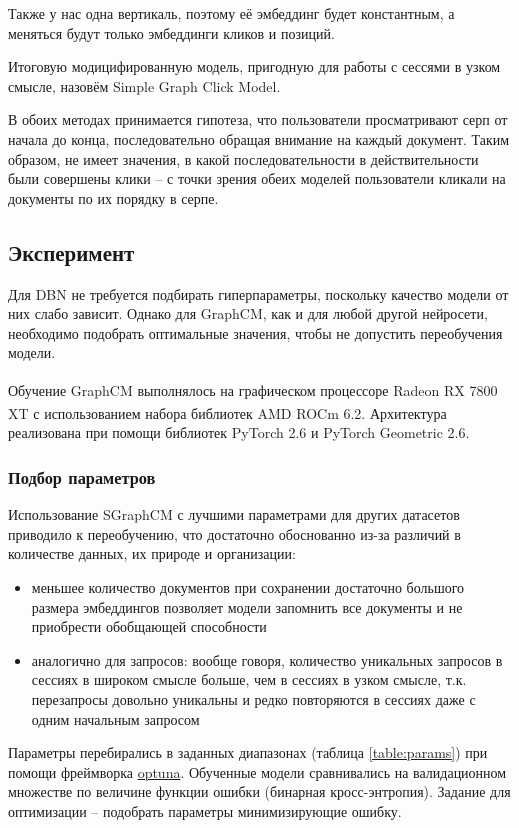\documentclass[diploma]{nanolab2015}
\begin{document}
Также у нас одна вертикаль, поэтому её эмбеддинг будет константным, а меняться будут только эмбеддинги кликов и позиций.

Итоговую модицифированную модель, пригодную для работы с сессями в узком смысле, назовём Simple Graph Click Model.

\bigbreak

В обоих методах принимается гипотеза, что пользователи просматривают серп от начала до конца, последовательно обращая внимание на каждый документ. Таким образом, не имеет значения, в какой последовательности в действительности были совершены клики -- с точки зрения обеих моделей пользователи кликали на документы по их порядку в серпе.

\subsection{Эксперимент}
Для DBN не требуется подбирать гиперпараметры, поскольку качество модели от них слабо зависит. Однако для GraphCM, как и для любой другой нейросети, необходимо подобрать оптимальные значения, чтобы не допустить переобучения модели.

Обучение GraphCM выполнялось на графическом процессоре Radeon\textsuperscript{\texttrademark} RX 7800 XT с использованием набора библиотек AMD ROCm\textsuperscript{\texttrademark} 6.2. Архитектура реализована при помощи библиотек PyTorch 2.6 и PyTorch Geometric 2.6.
\subsubsection{Подбор параметров}
Использование SGraphCM с лучшими параметрами для других датасетов приводило к переобучению, что достаточно обоснованно из-за различий в количестве данных, их природе и организации:
\begin{itemize}
  \item меньшее количество документов при сохранении достаточно большого размера эмбеддингов позволяет модели запомнить все документы и не приобрести обобщающей способности
  \item аналогично для запросов: вообще говоря, количество уникальных запросов в сессиях в широком смысле больше, чем в сессиях в узком смысле, т.к. перезапросы довольно уникальны и редко повторяются в сессиях даже с одним начальным запросом
\end{itemize}

Параметры перебирались в заданных диапазонах (таблица \ref{table:params}) при помощи фреймворка \href{https://optuna.org/}{optuna}. Обученные модели сравнивались на валидационном множестве по величине функции ошибки (бинарная кросс-энтропия). Задание для оптимизации -- подобрать параметры минимизирующие ошибку.
\end{document}
